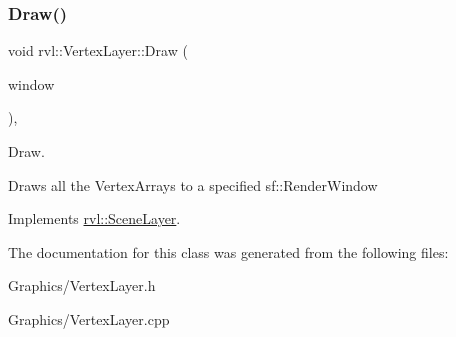 \subsubsection{\texorpdfstring{Draw()}{Draw()}}
{\footnotesize\ttfamily void rvl\+::\+Vertex\+Layer\+::\+Draw (\begin{DoxyParamCaption}\item[{sf\+::\+Render\+Window \&}]{window }\end{DoxyParamCaption})\hspace{0.3cm}{\ttfamily [override]}, {\ttfamily [virtual]}}



Draw. 

Draws all the Vertex\+Arrays to a specified sf\+::\+Render\+Window 

Implements \hyperlink{classrvl_1_1_scene_layer}{rvl\+::\+Scene\+Layer}.



The documentation for this class was generated from the following files\+:\begin{DoxyCompactItemize}
\item 
Graphics/Vertex\+Layer.\+h\item 
Graphics/Vertex\+Layer.\+cpp\end{DoxyCompactItemize}
